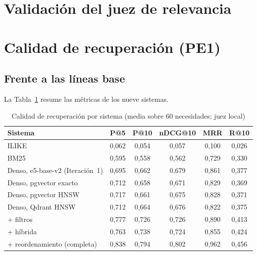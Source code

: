 \section{Validación del juez de relevancia}
\label{sec:res-juez}


\section{Calidad de recuperación (PE1)}
\label{sec:res-pe1}

\subsection{Frente a las líneas base}

La Tabla~\ref{tab:res-pe1-global} resume las métricas de los nueve sistemas.

\begin{table}[htbp!]
    \centering
    \caption{Calidad de recuperación por sistema (media sobre 60 necesidades; juez local)}
    \label{tab:res-pe1-global}
    \begin{tabular}{|l|c|c|c|c|c|}
        \hline
        \textbf{Sistema} & \textbf{P@5} & \textbf{P@10} & \textbf{nDCG@10} & \textbf{MRR} & \textbf{R@10} \\
        \hline
        ILIKE & 0{,}062 & 0{,}054 & 0{,}057 & 0{,}100 & 0{,}026 \\
        \hline
        BM25 & 0{,}595 & 0{,}558 & 0{,}562 & 0{,}729 & 0{,}330 \\
        \hline
        Denso, e5-base-v2 (Iteración~1) & 0{,}695 & 0{,}662 & 0{,}679 & 0{,}861 & 0{,}377 \\
        \hline
        Denso, pgvector exacto & 0{,}712 & 0{,}658 & 0{,}671 & 0{,}829 & 0{,}369 \\
        \hline
        Denso, pgvector HNSW & 0{,}717 & 0{,}661 & 0{,}675 & 0{,}828 & 0{,}371 \\
        \hline
        Denso, Qdrant HNSW & 0{,}712 & 0{,}664 & 0{,}676 & 0{,}822 & 0{,}375 \\
        \hline
        + filtros & 0{,}777 & 0{,}726 & 0{,}726 & 0{,}890 & 0{,}413 \\
        \hline
        + híbrida & 0{,}763 & 0{,}738 & 0{,}724 & 0{,}855 & 0{,}424 \\
        \hline
        + reordenamiento (completa) & 0{,}838 & 0{,}794 & 0{,}802 & 0{,}962 & 0{,}456 \\
        \hline
    \end{tabular}
\end{table}


